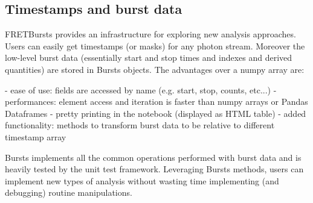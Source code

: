 \subsection{Timestamps and burst data}
\label{sec:burststimes}

FRETBursts provides an infrastructure for exploring new analysis approaches.
Users can easily get timestamps (or masks) for any photon stream.
Moreover the low-level burst data (essentially start and stop times and indexes 
and derived quantities) are stored in Bursts objects. 
The advantages over a numpy array are:

- ease of use: fields are accessed by name (e.g. start, stop, counts, etc...)
- performances: element access and iteration is faster than numpy arrays or Pandas Dataframes
- pretty printing in the notebook (displayed as HTML table)
- added functionality: methods to transform burst data to be relative to different timestamp array

Bursts implements all the common operations performed with burst data and is heavily 
tested by the unit test framework. Leveraging Bursts methods, users can implement new 
types of analysis without wasting time implementing (and debugging) routine manipulations.

